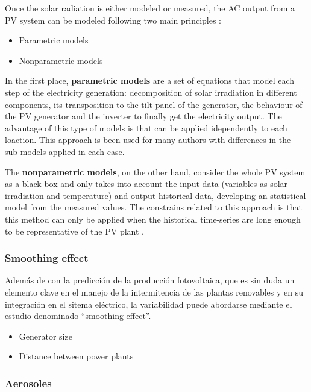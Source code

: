 Once the solar radiation is either modeled or measured, the AC output from a PV system can be modeled following two main principles \cite*{Almeida2015}:

\begin{itemize}
\item Parametric models
\item Nonparametric models
\end{itemize}

In the first place, \textbf{parametric models} are a set of equations that model each step of the electricity generation: decomposition of solar irradiation in different components, its transposition to the tilt panel of the generator, the behaviour of the PV generator and the inverter to finally get the electricity output. The advantage of this type of models is that can be applied idependently to each loaction. This approach is been used for many authors \cite*{Bofinger2006, Lorenz2008, Lorenz2011} with differences in the sub-models applied in each case.

The \textbf{nonparametric models}, on the other hand, consider the whole PV system as a black box and only takes into account the input data (variables as solar irradiation and temperature) and output historical data, developing an statistical model from the measured values. The constrains related to this approach is that this method can only be applied when the historical time-series are long enough to be representative of the PV plant \cite*{Bacher2009}. 

\subsubsection{Smoothing effect}

Además de con la predicción de la producción fotovoltaica, que es sin duda un elemento clave en el manejo de la intermitencia de las plantas renovables y en su integración en el sitema eléctrico, la variabilidad puede abordarse mediante el estudio denominado ``smoothing effect''.

\begin{itemize}
\item{Generator size}
\item{Distance between power plants}
\end{itemize}

\subsubsection{Aerosoles}

